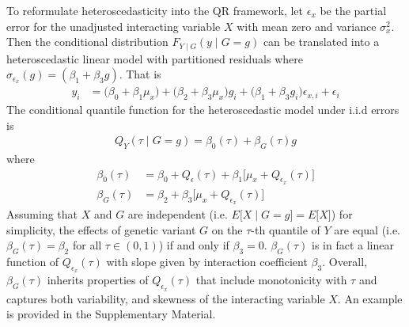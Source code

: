 \documentclass[12pt]{article}
\begin{document}
\begin{appendices}
To reformulate heteroscedasticity into the QR framework, let $\epsilon_x$ be the partial error for the unadjusted interacting variable $X$ with mean zero and variance $\sigma_x^2$. Then the conditional distribution $F_{Y \mid G}(y \mid G=g)$ can be translated into a heteroscedastic linear model with partitioned residuals where $\sigma_{\epsilon_{x}}(g) = (\beta_1 + \beta_3 g)$. That is 
\begin{equation} \label{hetMod}
\begin{split}
y_i &= \big(\beta_0+\beta_1 \mu_x\big) + \big(\beta_2 + \beta_3 \mu_x\big)g_i + \big(\beta_1 + \beta_3 g_i\big) \epsilon_{x,i} + \epsilon_{i} 
\end{split}
\end{equation}
The conditional quantile function for the heteroscedastic model under i.i.d errors is
\begin{equation} \label{firstQR}
\begin{split}
Q_Y (\tau \mid G=g) = \beta_0 (\tau) + \beta_G (\tau)g
\end{split}
\end{equation}
where
\begin{equation*} 
	\begin{split}
		\beta_0(\tau) &= \beta_0+Q_{\epsilon}(\tau)+\beta_1 \big[\mu_x+Q_{\epsilon_x}(\tau)\big] \\
		\beta_G (\tau) &= \beta_2 + \beta_3\big[\mu_x + Q_{\epsilon_x}(\tau)\big]
	\end{split}
\end{equation*}
Assuming that $X$ and $G$ are independent (i.e. $E\big[X \mid G=g\big]=E\big[X\big]$) for simplicity, the effects of genetic variant $G$ on the $\tau$-th quantile of $Y$ are equal (i.e. $\beta_G (\tau) = \beta_2$ for all $\tau \in (0,1)$) if and only if $\beta_3=0$. $\beta_G (\tau)$ is in fact a linear function of $Q_{\epsilon_x}(\tau)$ with slope given by interaction coefficient $\beta_3$. Overall, $\beta_G (\tau)$ inherits properties of $Q_{\epsilon_x}(\tau)$ that include monotonicity with $\tau$ and captures both variability, and skewness of the interacting variable $X$. An example is provided in the Supplementary Material.  


\end{appendices}
\end{document}
